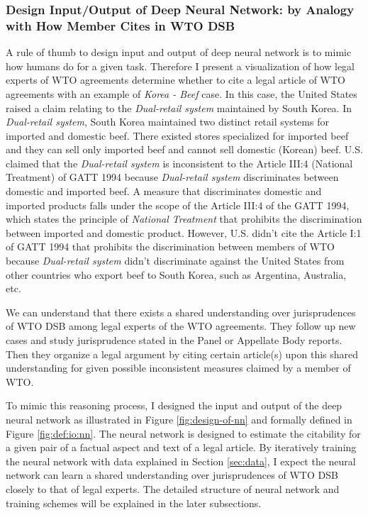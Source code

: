 \documentclass[12pt,letterpaper]{article}
\begin{document}
\subsubsection{Design Input/Output of Deep Neural Network: by Analogy with How Member Cites in WTO DSB} \label{design:io}
A rule of thumb to design input and output of deep neural network is to mimic
how humans do for a given task.
Therefore I present a visualization of how legal experts of WTO agreements determine whether to cite a legal article of WTO agreements with an example of \textit{Korea - Beef} case. %
In this case, the United States raised a claim relating to the \textit{Dual-retail system} maintained by South Korea. In \textit{Dual-retail system}, South Korea maintained two distinct retail systems
for imported and domestic beef. There existed stores specialized for imported beef and they can sell only imported beef and cannot sell domestic (Korean) beef. U.S. claimed that the \textit{Dual-retail system} is inconsistent to the Article III:4 (National Treatment) of GATT 1994
because \textit{Dual-retail system} discriminates between domestic and imported beef. A measure that discriminates domestic and imported products falls under the scope of the Article III:4 of the GATT 1994, which states the principle of \textit{National Treatment} that prohibits the discrimination between imported and domestic product. However, U.S. didn't
cite the Article I:1 of GATT 1994 that prohibits the discrimination between members of WTO
because \textit{Dual-retail system} didn't discriminate against the United States from other countries who export beef to South Korea, such as Argentina, Australia, etc.
 
We can understand that there exists a shared understanding over jurisprudences of WTO DSB among legal experts of the WTO agreements. They follow up new cases and study jurisprudence stated in the Panel or Appellate Body reports.
Then they organize a legal argument by citing certain article(s) upon this shared understanding for given possible inconsistent measures claimed by a member of WTO.
 
To mimic this reasoning process, I designed the input and output of the deep neural network as illustrated in Figure \ref{fig:design-of-nn} and formally defined in Figure \ref{fig:def:io:nn}.
The neural network is designed to estimate the citability for a given pair of a factual aspect and text of a legal article.
By iteratively training the neural network with data explained in Section \ref{sec:data}, I expect the neural network can learn a shared understanding over jurisprudences of WTO DSB closely to that of legal experts.
The detailed structure of neural network and training schemes will be explained in the later subsections.

\end{document}
